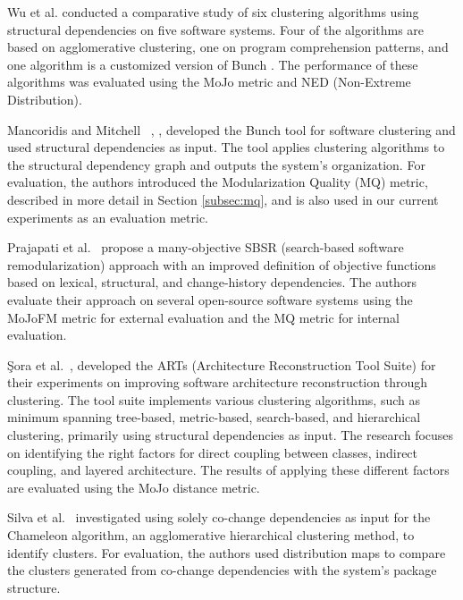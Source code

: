 Wu et al. \cite{wu} conducted a comparative study of six clustering algorithms using structural dependencies on five software systems. Four of the algorithms are based on agglomerative clustering, one on program comprehension patterns, and one algorithm is a customized version of Bunch \cite{b10}. The performance of these algorithms was evaluated using the MoJo metric and NED (Non-Extreme Distribution).

Mancoridis and Mitchell ~\cite{b10}, \cite{b2}, \cite{bunch} developed the Bunch tool for software clustering and used structural dependencies as input. The tool applies clustering algorithms to the structural dependency graph and outputs the system's organization. For evaluation, the authors introduced the Modularization Quality (MQ) metric, described in more detail in Section \ref{subsec:mq}, and is also used in our current experiments as an evaluation metric.


Prajapati et al.~\cite{b18} propose a many-objective SBSR (search-based software remodularization) approach with an improved definition of objective functions based on lexical, structural, and change-history dependencies. The authors evaluate their approach on several open-source software systems using the MoJoFM metric for external evaluation and the MQ metric for internal evaluation.

Şora et al.~\cite{SoraSem13}, \cite{SoraConti} developed the ARTs (Architecture Reconstruction Tool Suite) for their experiments on improving software architecture reconstruction through clustering. The tool suite implements various clustering algorithms, such as minimum spanning tree-based, metric-based, search-based, and hierarchical clustering, primarily using structural dependencies as input. The research focuses on identifying the right factors for direct coupling between classes, indirect coupling, and layered architecture. The results of applying these different factors are evaluated using the MoJo distance metric.

Silva et al.~\cite{b16} investigated using solely co-change dependencies as input for the Chameleon algorithm, an agglomerative hierarchical clustering method, to identify clusters. For evaluation, the authors used distribution maps to compare the clusters generated from co-change dependencies with the system's package structure.


